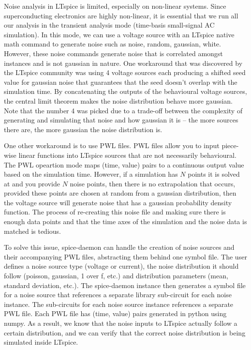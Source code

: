 \documentclass{article}
\newcommand{\cf}[1]{\textsf{#1}}
\begin{document}
Noise analysis in LTspice is limited, especially on non-linear systems. Since superconducting electronics
are highly non-linear, it is essential that we run all our analysis in the transient analysis mode (time-basis 
small-signal AC simulation). In this mode, we can use a voltage source with an LTspice native math command
to generate noise such as \cf{noise}, \cf{random}, \cf{gaussian}, \cf{white}. However, these noise commands
generate noise that is correlated amongst instances and is not gaussian in nature. One workaround that was
discovered by the LTspice community was using 4 voltage sources each producing a shifted seed value for 
gaussian noise that guarantees that the seed doesn't overlap with the simulation time. By concatenating the
outputs of the behavioural voltage sources, the central limit theorem makes the noise distribution behave more 
gaussian. Note that the number 4 was picked due to a trade-off between the complexity of generating and simulating
that noise and how gaussian it is -- the more sources there are, the more gaussian the noise distribution is.

One other workaround is to use PWL files. PWL files allow you to input piece-wise linear functions into LTspice
sources that are not necessarily behavioural. The PWL opeartion mode maps (time, value) pairs to a continuous 
output value based on the simulation time. However, if a simulation has $N$ points it is solved at and you 
provide $N$ noise points, then there is no extrapolation that occurs, provided these points are chosen at random 
from a gaussian distribution, then the voltage source will generate noise that has a gaussian probability density
function. The process of re-creating this noise file and making sure there is enough data points and that the time
axes of the simulation and the noise data is matched is tedious.

To solve this issue, spice-daemon can handle the creation of noise sources and their accompanying PWL files,
abstracting them behind one symbol file. The user defines a noise source type (voltage or current), the 
noise distribution it should follow (poisson, gaussian, 1 over f, etc.) and distribution parameters (mean, 
standard deviation, etc.). The spice-daemon instance then generates a symbol file for a noise source that 
references a separate library sub-circuit for each noise instance. The sub-circuits for each noise source 
instance references a separate PWL file. Each PWL file has (time, value) pairs generated in python using
numpy. As a result, we know that the noise inputs to LTspice actually follow a certain distribution, and we
can verify that the correct noise distribution is being simulated inside LTspice.
\end{document}
